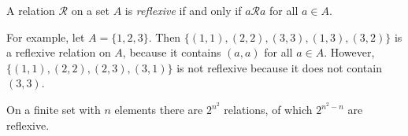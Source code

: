 \documentclass[12pt]{article}
\begin{document}

A relation $\mathcal{R}$ on a set $A$
is \emph{reflexive} if and only if $a\mathcal{R}a$ for all $a\in A$.

For example, let $A = \{1,2,3\}$.
Then $\{(1,1), (2,2), (3,3), (1,3), (3,2)\}$ is a reflexive relation on $A$,
because it contains $(a,a)$ for all $a \in A$.
However, $\{(1,1), (2,2), (2,3), (3,1)\}$ is not reflexive
because it does not contain $(3,3)$.

On a finite set with $n$ elements there are $2^{n^2}$ relations,
of which $2^{n^2-n}$ are reflexive.

\end{document}
